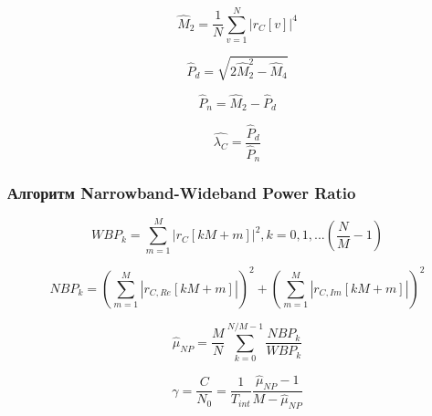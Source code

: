 \begin{center}
\begin{equation}
	\hat M_2 = \frac{1}{N} \sum \limits_{v=1}^{N} \left|r_C[v] \right| ^4
\end{equation}
\end{center}

\begin{center}
\begin{equation}
	\hat P_d = \sqrt{2 \hat M^2_2 - \hat M_4} 
\end{equation}
\end{center}

\begin{center}
\begin{equation}
	\hat P_n = \hat M_2 - \hat P_d
\end{equation}
\end{center}

\begin{center}
\begin{equation}
	\hat{\lambda_C} = \frac{\hat P_d}{\hat P_n}
\end{equation}
\end{center}

\subsubsection{Алгоритм Narrowband-Wideband Power Ratio}
\begin{center}
\begin{equation}
	WBP_k = \sum \limits_{m=1}^{M} \left|r_C[kM+m] \right| ^2, k=0,1,...(\frac{N}{M}-1)
\end{equation}
\end{center}

\begin{center}
\begin{equation}
	NBP_k = (\sum \limits_{m=1}^{M} \left|r_{C,Re}[kM+m] \right| )^2 + (\sum \limits_{m=1}^{M} \left|r_{C,Im}[kM+m] \right| )^2
\end{equation}
\end{center}

\begin{center}
\begin{equation}
	\hat \mu_{NP} = \frac{M}{N} \sum \limits_{k=0}^{N/M-1} \frac{NBP_k}{WBP_k}
\end{equation}
\end{center}

\begin{center}
\begin{equation}
	\gamma = \frac{C}{N_0} = \frac{1}{T_{int}} \frac{\hat \mu_{NP} - 1}{M - \hat \mu_{NP}}
\end{equation}
\end{center}

\newpage
